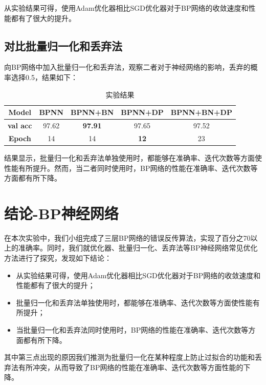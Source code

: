 \documentclass[withoutpreface,bwprint]{cumcmthesis} %
\begin{document}
   从实验结果可得，使用Adam优化器相比SGD优化器对于BP网络的收敛速度和性能都有了很大的提升。


\subsection{对比批量归一化和丢弃法}

向BP网络中加入批量归一化和丢弃法，观察二者对于神经网络的影响，丢弃的概率选择0.5，结果如下：
\begin{table}[H]
\centering
\caption{实验结果}
\begin{tabular}{|c|c|c|c|c|}
\hline
\textbf{Model}   & \textbf{BPNN} & \textbf{BPNN+BN} & \textbf{BPNN+DP}     & \textbf{BPNN+BN+DP} \\ \hline
\textbf{val acc} & 97.62         & \textbf{97.91}   & 97.65       & 97.52      \\ \hline
\textbf{Epoch}   & 14            & 14               & \textbf{12} & 23         \\ \hline
\end{tabular}
\end{table}
结果显示，批量归一化和丢弃法单独使用时，都能够在准确率、迭代次数等方面使性能有所提升。然而，当二者同时使用时，BP网络的性能在准确率、迭代次数等方面都有所下降。
   
   
   
\section{结论-BP神经网络}
	在本次实验中，我们小组完成了三层BP网络的错误反传算法，实现了百分之70以上的准确率。同时，我们就优化器、批量归一化、丢弃法等BP神经网络常见优化方法进行了探究，发现如下结论：
	\begin{itemize}
	\item    从实验结果可得，使用Adam优化器相比SGD优化器对于BP网络的收敛速度和性能都有了很大的提升；
	\item 批量归一化和丢弃法单独使用时，都能够在准确率、迭代次数等方面使性能有所提升；
	\item 当批量归一化和丢弃法同时使用时，BP网络的性能在准确率、迭代次数等方面都有所下降。
	\end{itemize}
	其中第三点出现的原因我们推测为批量归一化在某种程度上防止过拟合的功能\cite{3}和丢弃法有所冲突，从而导致了BP网络的性能在准确率、迭代次数等方面性能的下降。
	

\end{document}
